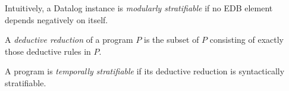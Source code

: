 Intuitively, a Datalog instance is {\em modularly stratifiable} if no EDB
element depends negatively on itself.


%
%

%

%
%

%
%


\begin{definition}
%
A \emph{deductive reduction} of a \lang program $P$ is the subset of $P$
consisting of exactly those deductive rules in $P$.
%
\end{definition}

\begin{definition} 
%
A \lang program is \emph{temporally stratifiable} if its deductive
reduction is syntactically stratifiable.
%
\end{definition}

